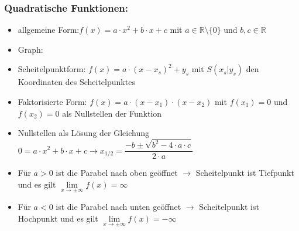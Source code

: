 \documentclass[a4paper,twocolumn,10pt]{onepgnote}
\begin{document}
\subsubsection{Quadratische Funktionen:}
\begin{itemize}
\item allgemeine Form:$f(x) = a\cdot x^2 + b\cdot x +c$ mit $a\in \mathds{R}\setminus \{0\}$ und $b, c \in \mathds{R}$
\item Graph: 
\item Scheitelpunktform: $f(x) = a\cdot(x-x_s)^2 +y_s$ mit $S(x_s|y_s)$ den Koordinaten des Scheitelpunktes
\item Faktorisierte Form: $f(x)= a\cdot (x-x_1)\cdot (x-x_2)$ mit $f(x_1)= 0$ und $f(x_2)= 0$ als Nullstellen der Funktion
\item Nullstellen als Lösung der Gleichung\\ $0 =a\cdot x^2 + b\cdot x +c \longrightarrow x_{1/2} = \dfrac{-b\pm\sqrt{b^2-4\cdot a\cdot c}}{2\cdot a}$
\item Für $a>0$ ist die Parabel nach oben geöffnet $\longrightarrow$ Scheitelpunkt ist Tiefpunkt und es gilt $
\lim\limits_{x \to \pm\infty} f(x) = \infty$
\item Für $a<0$ ist die Parabel nach unten geöffnet $\longrightarrow$ Scheitelpunkt ist Hochpunkt und es gilt $
\lim\limits_{x \to \pm\infty} f(x) = -\infty$\\[0.15cm]
\end{itemize}
\end{document}
